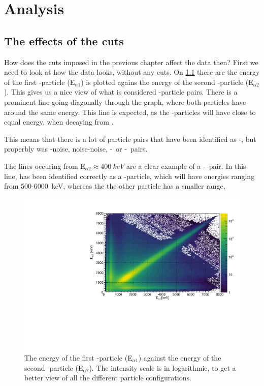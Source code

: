 \chapter{Analysis}
\section{The effects of the cuts}
How does the cuts imposed in the previous chapter affect the data then?
First we need to look at how the data looks, without any cuts. On \cref{fig:EENoCuts} there are the energy of the first \al-particle (E$_{\alpha1}$) is plotted agains the energy of the second \al-particle (E$_{\alpha2}$).
This gives us a nice view of what is considered \al-particle pairs. There is a prominent line going diagonally through the graph, where both particles have around the same energy. This line is expected, as the \al-particles will have close to equal energy, when decaying from \ber. 

This means that there is a lot of particle pairs that have been identified as \al-\al, but properbly was \al-noise, noise-noise, \al-\be\ or \be-\be\ pairs. 

The lines occuring from E$_{\alpha2} \approx \SI{400}{keV}$ are a clear example of a \al-\be\ pair. In this line,  has been identified correctly as a \al-particle, which will have energies ranging from 500-\SI{6000}{keV}, whereas the the other particle has a smaller range, 

\begin{figure}[h]
	\includegraphics[width=\linewidth]{../figures/EENoCuts.pdf}
	\caption{The energy of the first \al-particle (E$_{\alpha1}$) against the energy of the second \al-particle (E$_{\alpha2}$). The intensity scale is in logarithmic, to get a better view of all the different particle configurations.}
	\label{fig:EENoCuts}
\end{figure}

